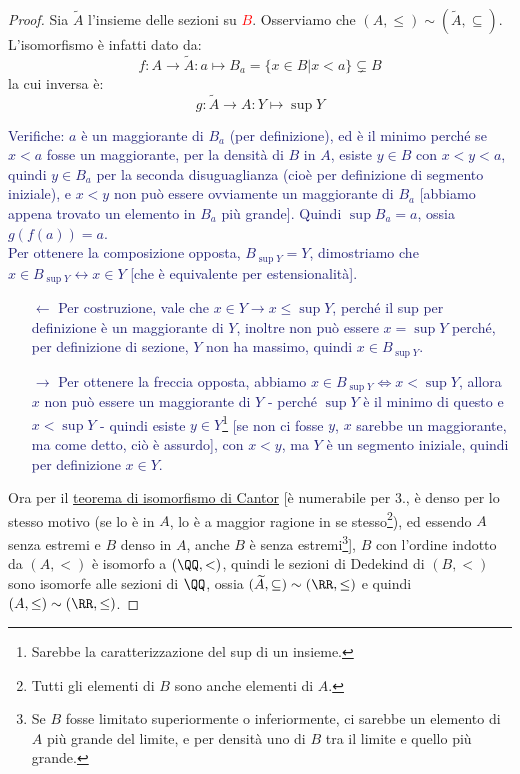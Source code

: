 \documentclass[11pt]{scrartcl}
\begin{document}
\begin{proof}
	Sia $\widetilde{A}$ l'insieme delle sezioni su \textcolor{red}{$B$}. Osserviamo che $(A,\leq) \sim (\widetilde{A},\subseteq)$. L'isomorfismo è infatti dato da:
	\[ f : A \rightarrow \widetilde{A} : a \mapsto B_a = \{x \in B | x < a\}\subsetneq B
		\]
	la cui inversa è:
	\[ g : \widetilde{A} \rightarrow A : Y \mapsto \sup Y
		\]
	\textcolor{MidnightBlue}{Verifiche: $a$ è un maggiorante di $B_a$ (per definizione), ed è il minimo perché se $x<a$ fosse un maggiorante, per la densità di $B$ in $A$, esiste $y \in B$ con $x<y<a$, quindi $y \in B_a$ per la
	seconda disuguaglianza (cioè per definizione di segmento iniziale), e $x<y$ non può essere ovviamente un maggiorante di $B_a$ [abbiamo appena trovato un elemento in $B_a$ più grande]. Quindi $\sup B_a = a$, ossia $g(f(a)) = a$.\\
	Per ottenere la composizione opposta, $B_{\sup Y} = Y$, dimostriamo che $x \in B_{\sup Y} \leftrightarrow x \in Y$ [che è equivalente per estensionalità].
	\begin{itemize}
		\item[$\boxed{\longleftarrow}$] Per costruzione, vale che $x \in Y \rightarrow x \leq \sup Y$, perché il sup per definizione è un maggiorante di $Y$, inoltre 
		non può essere $x = \sup Y$ perché, per definizione di sezione, $Y$ non ha massimo, quindi $x \in B_{\sup Y}$.
		\item[$\boxed{\longrightarrow}$] Per ottenere la freccia opposta, abbiamo $x \in B_{\sup Y} \iff x < \sup Y$, allora $x$ non può essere un maggiorante di $Y$
		- perché $\sup Y$ è il minimo di questo e $x < \sup Y$ - quindi esiste $y \in Y$\footnote{Sarebbe la caratterizzazione del sup di un insieme.} [se non ci fosse $y$, $x$ sarebbe un maggiorante, ma come detto, ciò è assurdo], con $x < y$, ma $Y$ è un segmento iniziale, quindi per definizione $x \in Y$.
	\end{itemize}}
	Ora per il \hyperref[isoCantor]{teorema di isomorfismo di Cantor} [è numerabile per 3., è denso per lo stesso motivo (se lo è in $A$, lo è
	a maggior ragione in se stesso\footnote{Tutti gli elementi di $B$ sono anche elementi di $A$.}), ed essendo $A$ senza estremi e $B$ denso
	in $A$, anche $B$ è senza estremi\footnote{Se $B$ fosse limitato superiormente o inferiormente, ci sarebbe un elemento di $A$ più grande del
	limite, e per densità uno di $B$ tra il limite e quello più grande.}], $B$ con l'ordine indotto da $(A,<)$ è isomorfo a $(\QQ,<)$, quindi le
	sezioni di Dedekind di $(B,<)$ sono isomorfe alle sezioni di $\QQ$, ossia $(\widetilde{A},\subseteq) \sim (\RR, \leq)$ e quindi $(A,\leq) \sim (\RR,\leq)$.
\end{proof}
\end{document}
